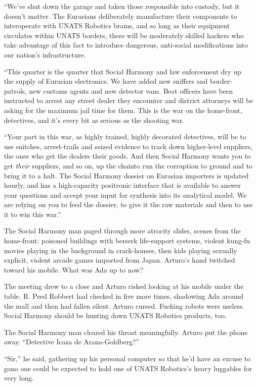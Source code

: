 “We’ve shut down the garage and taken those responsible into
custody, but it doesn’t matter. The Eurasians deliberately
manufacture their components to interoperate with UNATS Robotics
brains, and so long as their equipment circulates within UNATS
borders, there will be moderately skilled hackers who take
advantage of this fact to introduce dangerous, anti-social
modifications into our nation’s infrastructure.

“This quarter is the quarter that Social Harmony and law
enforcement dry up the supply of Eurasian electronics. We have
added new sniffers and border-patrols, new customs agents and new
detector vans. Beat officers have been instructed to arrest any
street dealer they encounter and district attorneys will be asking
for the maximum jail time for them. This is the war on the
home-front, detectives, and it’s every bit as serious as the
shooting war.

“Your part in this war, as highly trained, highly decorated
detectives, will be to use snitches, arrest-trails and seized
evidence to track down higher-level suppliers, the ones who get the
dealers their goods. And then Social Harmony wants you to get
\emph{their} suppliers, and so on, up the chain{\dash}to run the
corruption to ground and to bring it to a halt. The Social Harmony
dossier on Eurasian importers is updated hourly, and has a
high-capacity positronic interface that is available to answer your
questions and accept your input for synthesis into its analytical
model. We are relying on you to feed the dossier, to give it the
raw materials and then to use it to win this war.”

The Social Harmony man paged through more atrocity slides, scenes
from the home-front: poisoned buildings with berserk life-support
systems, violent kung-fu movies playing in the background in
crack-houses, then kids playing sexually explicit, violent arcade
games imported from Japan. Arturo’s hand twitched toward his
mobile. What was Ada up to now?

The meeting drew to a close and Arturo risked looking at his mobile
under the table. R. Peed Robbert had checked in five more times,
shadowing Ada around the mall and then had fallen silent. Arturo
cursed. Fucking robots were useless. Social Harmony should be
hunting down UNATS Robotics products, too.

The Social Harmony man cleared his throat meaningfully. Arturo put
the phone away. “Detective Icaza de Arana-Goldberg?”

“Sir,” he said, gathering up his personal computer so that he’d
have an excuse to go{\dash}no one could be expected to hold one of UNATS
Robotics’s heavy luggables for very long.

